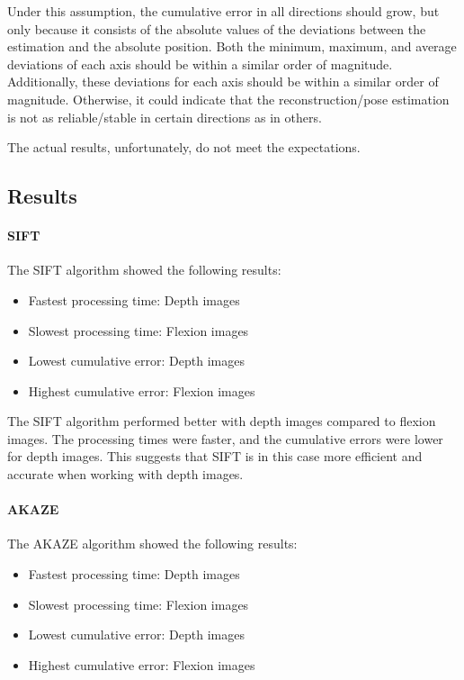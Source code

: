 \documentclass[conference, a4paper]{IEEEtran}
\begin{document}
Under this assumption, the cumulative error in all directions should grow, but only because it consists of the absolute values of the deviations between the estimation and the absolute position. Both the minimum, maximum, and average deviations of each axis should be within a similar order of magnitude. Additionally, these deviations for each axis should be within a similar order of magnitude. Otherwise, it could indicate that the reconstruction/pose estimation is not as reliable/stable in certain directions as in others.

The actual results, unfortunately, do not meet the expectations.
\subsection{Results}
\paragraph{SIFT}
The SIFT algorithm showed the following results:

\begin{itemize}
	\item Fastest processing time: Depth images
	\item Slowest processing time: Flexion images
	\item Lowest cumulative error: Depth images
	\item Highest cumulative error: Flexion images
\end{itemize}

The SIFT algorithm performed better with depth images compared to flexion images. The processing times were faster, and the cumulative errors were lower for depth images. This suggests that SIFT is in this case more efficient and accurate when working with depth images.

\paragraph{AKAZE}
The AKAZE algorithm showed the following results:

\begin{itemize}
	\item Fastest processing time: Depth images
	\item Slowest processing time: Flexion images
	\item Lowest cumulative error: Depth images
	\item Highest cumulative error: Flexion images
\end{itemize}
\end{document}
